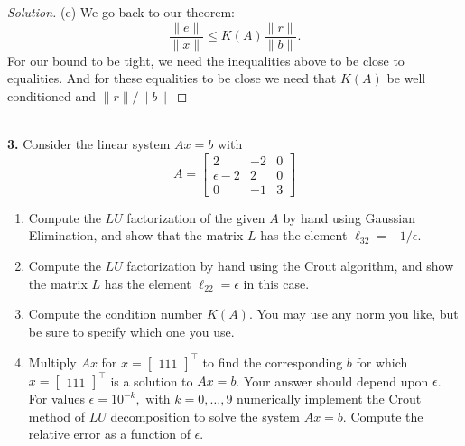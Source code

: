 \documentclass[12pt]{amsart}
\newenvironment{solution}
{\begin{proof}[Solution]}
{\end{proof}}
\begin{document}
\begin{onehalfspace}
\begin{solution}
            (e) We go back to our theorem:
            \begin{displaymath}
                \frac{\|e\|}{\|x\|} \le K(A) \frac{\|r\|}{\|b\|}.
            \end{displaymath}
            For our bound to be tight, we need the inequalities above to be close to equalities. And for these equalities
            to be close we need that $K(A)$ be well conditioned and $\|r\|/\|b\|$

        \end{solution}

        \quad\\
        \noindent\textbf{3.} Consider the linear system $Ax=b$ with
        \begin{displaymath}
            A = \left[\begin{matrix}
                          2 & -2 & 0\\
                          \epsilon-2 & 2 & 0 \\
                          0 & -1 & 3
            \end{matrix}\right]
        \end{displaymath}
        \begin{enumerate}[label=(\alph*)]
            \item Compute the $LU$ factorization of the given $A$ by hand using Gaussian Elimination, and show that the
                  matrix $L$ has the element $\ell_{32}=-1/\epsilon$.
            \item Compute the $LU$ factorization by hand using the Crout algorithm, and show the matrix $L$ has the
                  element $\ell_{22}=\epsilon$ in this case.
            \item Compute the condition number $K(A)$.
                  You may use any norm you like, but be sure to specify which one you use.
            \item Multiply $Ax$ for $x=[\begin{matrix}1 1 1\end{matrix}]^\top$ to find the corresponding $b$ for which
                  $x=[\begin{matrix}1 1 1\end{matrix}]^\top$ is a solution to $Ax=b$.
                  Your answer should depend upon $\epsilon$.
                  For values $\epsilon=10^{-k},$ with $k=0,\ldots,9$ numerically implement the Crout method of $LU$
                  decomposition to solve the system $Ax=b$.
                  Compute the relative error as a function of $\epsilon$.

\end{enumerate}
\end{onehalfspace}
\end{document}
